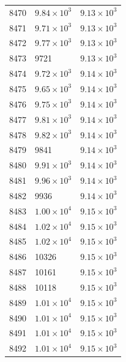 \begin{table}[H]
\begin{tabular}{lll}
8470 & $\displaystyle 9.84 \times 10^{3}$ & $\displaystyle 9.13 \times 10^{3}$ \\
8471 & $\displaystyle 9.71 \times 10^{3}$ & $\displaystyle 9.13 \times 10^{3}$ \\
8472 & $\displaystyle 9.77 \times 10^{3}$ & $\displaystyle 9.13 \times 10^{3}$ \\
8473 & 9721 & $\displaystyle 9.13 \times 10^{3}$ \\
8474 & $\displaystyle 9.72 \times 10^{3}$ & $\displaystyle 9.14 \times 10^{3}$ \\
8475 & $\displaystyle 9.65 \times 10^{3}$ & $\displaystyle 9.14 \times 10^{3}$ \\
8476 & $\displaystyle 9.75 \times 10^{3}$ & $\displaystyle 9.14 \times 10^{3}$ \\
8477 & $\displaystyle 9.81 \times 10^{3}$ & $\displaystyle 9.14 \times 10^{3}$ \\
8478 & $\displaystyle 9.82 \times 10^{3}$ & $\displaystyle 9.14 \times 10^{3}$ \\
8479 & 9841 & $\displaystyle 9.14 \times 10^{3}$ \\
8480 & $\displaystyle 9.91 \times 10^{3}$ & $\displaystyle 9.14 \times 10^{3}$ \\
8481 & $\displaystyle 9.96 \times 10^{3}$ & $\displaystyle 9.14 \times 10^{3}$ \\
8482 & 9936 & $\displaystyle 9.14 \times 10^{3}$ \\
8483 & $\displaystyle 1.00 \times 10^{4}$ & $\displaystyle 9.15 \times 10^{3}$ \\
8484 & $\displaystyle 1.02 \times 10^{4}$ & $\displaystyle 9.15 \times 10^{3}$ \\
8485 & $\displaystyle 1.02 \times 10^{4}$ & $\displaystyle 9.15 \times 10^{3}$ \\
8486 & 10326 & $\displaystyle 9.15 \times 10^{3}$ \\
8487 & 10161 & $\displaystyle 9.15 \times 10^{3}$ \\
8488 & 10118 & $\displaystyle 9.15 \times 10^{3}$ \\
8489 & $\displaystyle 1.01 \times 10^{4}$ & $\displaystyle 9.15 \times 10^{3}$ \\
8490 & $\displaystyle 1.01 \times 10^{4}$ & $\displaystyle 9.15 \times 10^{3}$ \\
8491 & $\displaystyle 1.01 \times 10^{4}$ & $\displaystyle 9.15 \times 10^{3}$ \\
8492 & $\displaystyle 1.01 \times 10^{4}$ & $\displaystyle 9.15 \times 10^{3}$ \\

\end{tabular}
\end{table}
